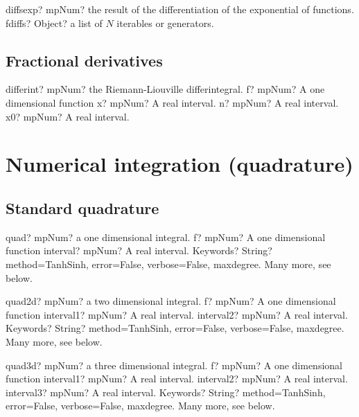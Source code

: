 \documentclass[12pt,a4paper,openany]{book}
\begin{document}
\begin{mpFunctionsExtract}
\mpFunctionOne
{diffsexp? mpNum? the result of the differentiation of the exponential of functions.}
{fdiffs? Object? a list of $N$ iterables or generators.}
\end{mpFunctionsExtract}

\section{Fractional derivatives}

\begin{mpFunctionsExtract}
\mpFunctionFour
{differint? mpNum? the Riemann-Liouville differintegral.}
{f? mpNum? A one dimensional function}
{x? mpNum? A real interval.}
{n? mpNum? A real interval.}
{x0? mpNum? A real interval.}
\end{mpFunctionsExtract}

\chapter{Numerical integration (quadrature)}

\section{Standard quadrature}

\begin{mpFunctionsExtract}
\mpFunctionThree
{quad? mpNum? a one dimensional integral.}
{f? mpNum? A one dimensional function}
{interval? mpNum? A real interval.}
{Keywords? String? method=TanhSinh, error=False, verbose=False, maxdegree. Many more, see below.}
\end{mpFunctionsExtract}

\begin{mpFunctionsExtract}
\mpFunctionFour
{quad2d? mpNum? a two dimensional integral.}
{f? mpNum? A one dimensional function}
{interval1? mpNum? A real interval.}
{interval2? mpNum? A real interval.}
{Keywords? String? method=TanhSinh, error=False, verbose=False, maxdegree. Many more, see below.}
\end{mpFunctionsExtract}

\begin{mpFunctionsExtract}
\mpFunctionFive
{quad3d? mpNum? a three dimensional integral.}
{f? mpNum? A one dimensional function}
{interval1? mpNum? A real interval.}
{interval2? mpNum? A real interval.}
{interval3? mpNum? A real interval.}
{Keywords? String? method=TanhSinh, error=False, verbose=False, maxdegree. Many more, see below.}
\end{mpFunctionsExtract}
\end{document}
